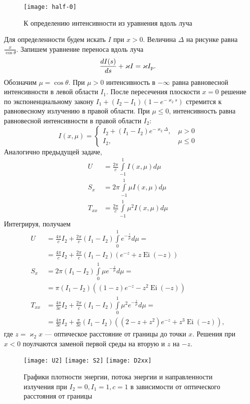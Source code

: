 \begin{figure}[ht!]%
\centering
\texttt{[image: half-0]}%
\caption{К определению интенсивности из уравнения вдоль луча}%
\label{pic:halfspace}%
\end{figure}
Для определенности будем искать $I$ при $x > 0$. 
Величина $\Delta$ на рисунке равна $\frac{x}{\cos \theta}$. Запишем уравнение переноса вдоль луча
\begin{equation*}
\frac{dI(s)}{ds} + \varkappa I = \varkappa I_\text{p}.
\end{equation*}
Обозначим $\mu = \cos \theta$. При $\mu > 0$ интенсивность в $-\infty$ равна равновесной интенсивности в левой области $I_1$.
После пересечения плоскости $x = 0$ решение по экспоненциальному закону $I_1 + (I_2 - I_1) (1 - e^{-\varkappa_2 s})$
стремится к равновесному излучению в правой области. При $\mu \leq 0$, интенсивность равна равновесной интенсивности в правой области $I_2$:
\begin{equation*}
I(x, \mu) = \begin{cases}
I_2 + (I_1 - I_2) e^{-\varkappa_2 \Delta}, &\,\mu > 0\\
I_2 , &\,\mu \leq 0
\end{cases}
\end{equation*}
Аналогично предыдущей задаче,
\begin{align}
U &= \frac{2\pi}{c} \int\limits_{-1}^1 I(x, \mu) d\mu\\
S_x &= 2\pi \int\limits_{-1}^1 \mu I(x, \mu) d\mu\\
T_{xx} &= \frac{2\pi}{c} \int\limits_{-1}^1 \mu^2 I(x, \mu) d\mu
\end{align}
Интегрируя, получаем
\begin{align}
U &= \frac{4\pi}{c} I_2 + \frac{2\pi}{c}(I_1 - I_2)\int\limits_0^1 e^{-\frac{z}{\mu}} d\mu = \nonumber\\
&=\frac{4\pi}{c} I_2 + \frac{2\pi}{c}(I_1 - I_2)\left(e^{-z} + z 
\operatorname{Ei}(-z)\right)\\
S_x &= 2\pi (I_1 - I_2)\int\limits_{0}^1 \mu e^{-\frac{z}{\mu}} d\mu = \nonumber\\
&= \pi (I_1 - I_2) \left((1 - z)e^{-z} - z^2
\operatorname{Ei}(-z)\right)\\
T_{xx} &= \frac{4\pi}{3c}I_2 + \frac{2\pi}{c} (I_1 - I_2)\int\limits_{0}^1 \mu^2 e^{-\frac{z}{\mu}} d\mu = 
\nonumber\\
&= \frac{4\pi}{3c}I_2 + \frac{\pi}{3c} (I_1 - I_2)\left((2 - z + z^2)e^{-z} + z^3 \operatorname{Ei}(-z)\right),
\end{align}
где $z = \varkappa_2 x$ --- оптическое расстояние от границы до точки $x$. Решения при $x < 0$ поулчаются
заменой первой среды на вторую и $z$ на $-z$.
\begin{figure}[ht!]%
\centering
\texttt{[image: U2]}\quad%
\texttt{[image: S2]}\quad%
\texttt{[image: D2xx]}%
\caption{Графики плотности энергии, потока энергии и направленности излучения при $I_2 = 0, I_1 = 1, c = 1$
в зависимости от оптического расстояния от границы}%
\end{figure}
